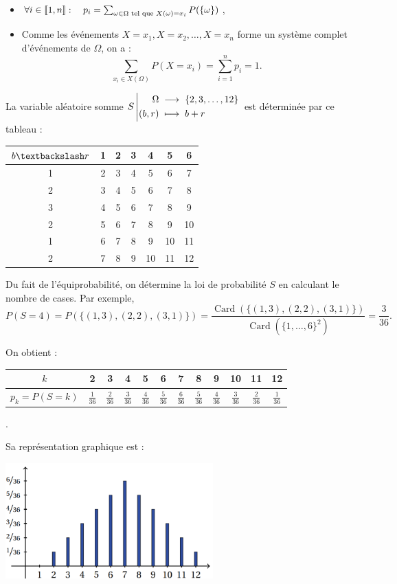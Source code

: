 \documentclass{book}
\begin{document}
\begin{Remarque}
\begin{itemize}
\item $\forall i\in \mathopen\lbrack\!\lbrack1,n \mathclose\rbrack\!\rbrack:\quad p_i=\sum_{\omega\in\Omega \text{ tel que }X(\omega)=x_i}P(\{\omega\})$,
\item Comme les événements $X=x_1,X=x_2,\dots,X=x_n$ forme un système complet d'événements de $\Omega$, on a :
$$\sum_{x_i\in X(\Omega)}P(X=x_i)=\sum_{i=1}^n p_i=1.$$
\end{itemize} 
\end{Remarque}

\begin{Exemple}[Jeu]
La variable aléatoire somme ${S}\left|\begin{aligned}{\Omega}&\;\longrightarrow\;{\{2,3,\dots,12\} }\\{(b, r)}&\;\longmapsto\;{b+r}\end{aligned}\right.$ est déterminée par ce tableau  :
\begin{center}
\begin{tabular}{c||c|c|c|c|c|c}
 $b\textbackslash r$ & 1 & 2&3&4&5&6 \\\hline\hline
1 & 2 & 3 & 4&5&6&7\\
2 & 3 & 4 & 5&6&7&8\\
3 & 4 & 5 & 6&7&8&9\\
2 & 5 & 6 & 7&8&9&10\\
1 & 6 & 7 & 8&9&10&11\\
2 & 7 & 8 & 9&10&11&12\\
\end{tabular}
\end{center}
Du fait de l'équiprobabilité, on détermine la loi de probabilité $S$ en calculant le nombre de cases. Par exemple,
$$P(S=4)=P(\{(1,3),(2,2),(3,1)\})=\frac{\operatorname{Card}(\{(1,3),(2,2),(3,1)\})}{\operatorname{Card}(\{1,\dots,6\}^2)}=\frac{3}{36}.$$ 

On obtient :
\begin{center}
\begin{tabular}{|c||c|c|c|c|c|c|c|c|c|c|c|}
\hline
$k$ & 2 & 3& 4& 5& 6& 7& 8& 9& 10& 11& 12 \\\hline
$p_k=P(S=k)$ & $\frac{1}{36}$ & $\frac{2}{36}$& $\frac{3}{36}$& $\frac{4}{36}$& $\frac{5}{36}$& $\frac{6}{36}$& $\frac{5}{36}$& $\frac{4}{36}$& $\frac{3}{36}$& $\frac{2}{36}$& $\frac{1}{36}$\\\hline
\end{tabular}.
\end{center}
Sa représentation graphique est :
\begin{center}
\includegraphics[width=8cm]{somme.png}
\end{center}
\end{Exemple}
\end{document}
